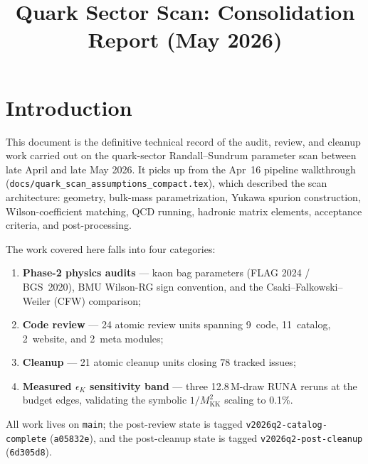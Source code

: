 \documentclass[11pt]{article}
\title{Quark Sector Scan: Consolidation Report (May 2026)}
\author{}
\date{}
\newcommand{\Mkk}{M_{\mathrm{KK}}}
\newcommand{\eK}{\epsilon_K}
\begin{document}
\maketitle

\section{Introduction}
\label{sec:intro}

This document is the definitive technical record of the audit,
review, and cleanup work carried out on the quark-sector
Randall--Sundrum parameter scan between late April and late May 2026.
It picks up from the Apr~16 pipeline walkthrough
(\texttt{docs/quark\_scan\_assumptions\_compact.tex}), which described
the scan architecture: geometry, bulk-mass parametrization, Yukawa
spurion construction, Wilson-coefficient matching, QCD running, hadronic
matrix elements, acceptance criteria, and post-processing.

The work covered here falls into four categories:
\begin{enumerate}[label=(\roman*)]
  \item \textbf{Phase-2 physics audits} --- kaon bag parameters (FLAG
    2024 / BGS~2020), BMU Wilson-RG sign convention, and the
    Csaki--Falkowski--Weiler (CFW) comparison;
  \item \textbf{Code review} --- 24 atomic review units spanning
    9~code, 11~catalog, 2~website, and 2~meta modules;
  \item \textbf{Cleanup} --- 21 atomic cleanup units closing 78 tracked
    issues;
  \item \textbf{Measured $\eK$ sensitivity band} --- three
    12.8\,M-draw RUNA reruns at the budget edges, validating the
    symbolic $1/\Mkk^2$ scaling to 0.1\%.
\end{enumerate}

All work lives on \texttt{main}; the post-review state is tagged
\texttt{v2026q2-catalog-complete} (\texttt{a05832e}), and the
post-cleanup state is tagged \texttt{v2026q2-post-cleanup}
(\texttt{6d305d8}).

\begin{center}
\setlength{\fboxsep}{8pt}
\end{center}
\end{document}
